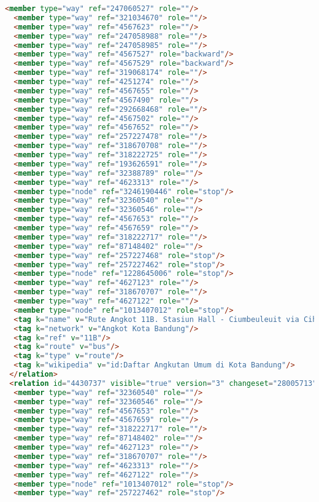 \begin{lstlisting}[language=HTML,basicstyle=\tiny,caption=bandung1.xml]
  <member type="way" ref="247060527" role=""/>
  <member type="way" ref="321034670" role=""/>
  <member type="way" ref="4567623" role=""/>
  <member type="way" ref="247058988" role=""/>
  <member type="way" ref="247058985" role=""/>
  <member type="way" ref="4567527" role="backward"/>
  <member type="way" ref="4567529" role="backward"/>
  <member type="way" ref="319068174" role=""/>
  <member type="way" ref="4251274" role=""/>
  <member type="way" ref="4567655" role=""/>
  <member type="way" ref="4567490" role=""/>
  <member type="way" ref="292668468" role=""/>
  <member type="way" ref="4567502" role=""/>
  <member type="way" ref="4567652" role=""/>
  <member type="way" ref="257227478" role=""/>
  <member type="way" ref="318670708" role=""/>
  <member type="way" ref="318222725" role=""/>
  <member type="way" ref="193626591" role=""/>
  <member type="way" ref="32388789" role=""/>
  <member type="way" ref="4623313" role=""/>
  <member type="node" ref="3246190446" role="stop"/>
  <member type="way" ref="32360540" role=""/>
  <member type="way" ref="32360546" role=""/>
  <member type="way" ref="4567653" role=""/>
  <member type="way" ref="4567659" role=""/>
  <member type="way" ref="318222717" role=""/>
  <member type="way" ref="87148402" role=""/>
  <member type="way" ref="257227468" role="stop"/>
  <member type="way" ref="257227462" role="stop"/>
  <member type="node" ref="1228645006" role="stop"/>
  <member type="way" ref="4627123" role=""/>
  <member type="way" ref="318670707" role=""/>
  <member type="way" ref="4627122" role=""/>
  <member type="node" ref="1013407012" role="stop"/>
  <tag k="name" v="Rute Angkot 11B. Stasiun Hall - Ciumbeuleuit via Cihampelas &quot;LURUS&quot;"/>
  <tag k="network" v="Angkot Kota Bandung"/>
  <tag k="ref" v="11B"/>
  <tag k="route" v="bus"/>
  <tag k="type" v="route"/>
  <tag k="wikipedia" v="id:Daftar Angkutan Umum di Kota Bandung"/>
 </relation>
 <relation id="4430737" visible="true" version="3" changeset="28005713" timestamp="2015-01-08T20:32:48Z" user="isonpurba" uid="2552445">
  <member type="way" ref="32360540" role=""/>
  <member type="way" ref="32360546" role=""/>
  <member type="way" ref="4567653" role=""/>
  <member type="way" ref="4567659" role=""/>
  <member type="way" ref="318222717" role=""/>
  <member type="way" ref="87148402" role=""/>
  <member type="way" ref="4627123" role=""/>
  <member type="way" ref="318670707" role=""/>
  <member type="way" ref="4623313" role=""/>
  <member type="way" ref="4627122" role=""/>
  <member type="node" ref="1013407012" role="stop"/>
  <member type="way" ref="257227462" role="stop"/>

\end{lstlisting}
